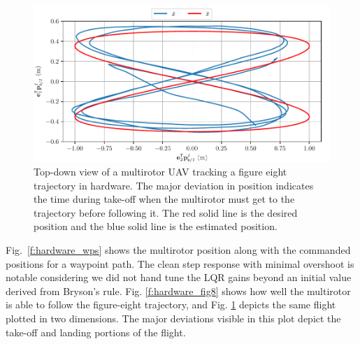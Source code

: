 \begin{figure}
  \centering
  \includegraphics[width=6.5in]{figures/mocap_fig8_position_2d}
  \caption[Top-Down View of LQR Hardware Trajectory Results]{Top-down view of a multirotor UAV tracking a figure eight
  trajectory in hardware. The major deviation in position indicates the time
during take-off when the multirotor must get to the trajectory before following
it. The red solid line is the desired position and the blue solid line is the
estimated position.}
  \label{f:hardware_fig8_2d}
\end{figure}

Fig.~\ref{f:hardware_wps} shows the multirotor position along with the commanded
positions for a waypoint path. The clean step response with minimal overshoot is
notable considering we did not hand tune the LQR gains beyond an initial value
derived from Bryson's rule. Fig. \ref{f:hardware_fig8} shows how well the
multirotor is able to follow the figure-eight trajectory, and Fig.
\ref{f:hardware_fig8_2d} depicts the same flight plotted in two dimensions. The
major deviations visible in this plot depict the take-off and landing portions
of the flight.
